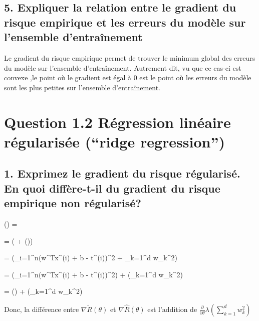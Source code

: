 \documentclass[12pt]{article}
\newenvironment{eqs*}{\begin{equation*}\begin{aligned}}{\end{aligned}\end{equation*}}
\begin{document}
\subsection{5. Expliquer la relation entre le gradient du risque empirique et les erreurs du modèle sur l'ensemble d'entraînement}
	Le gradient du risque empirique permet de trouver le minimum global des erreurs du modèle sur l'ensemble d'entraînement. Autrement dit, vu que ce cas-ci est convexe ,le point où le gradient est égal à 0 est le point où les erreurs du modèle sont les plus petites sur l'ensemble d'entraînement.


\section{Question 1.2 Régression linéaire régularisée (“ridge regression”)}

\subsection{1. Exprimez le gradient du risque régularisé. En quoi diffère-t-il du gradient du risque empirique non régularisé?}

	\begin{eqs*}
		\nabla{}(\theta) = 
	\end{eqs*}

	\begin{eqs*}
		= \frac{\partial}{\partial\theta}( + \lambda{}(\theta))
	\end{eqs*}

	\begin{eqs*}
		= \frac{\partial}{\partial\theta}(\sum_{i=1}^{n}(w^{T}x^{(i)} + b - t^{(i)})^{2} + \lambda\sum_{k=1}^{d} w_{k}^{2})
	\end{eqs*}

	\begin{eqs*}
		= \frac{\partial}{\partial\theta}(\sum_{i=1}^{n}(w^{T}x^{(i)} + b - t^{(i)})^{2}) + \frac{\partial}{\partial\theta}(\lambda\sum_{k=1}^{d} w_{k}^{2})
	\end{eqs*}

	\begin{eqs*}
		= \nabla{}(\theta) + \frac{\partial}{\partial\theta}\lambda(\sum_{k=1}^{d} w_{k}^{2})
	\end{eqs*}	
	
	Donc, la différence entre $\nabla\widetilde{R}(\theta)$ et $\nabla\hat{R}(\theta)$ est l'addition de $\frac{\partial}{\partial\theta}\lambda(\sum_{k=1}^{d} w_{k}^{2})$
\end{document}
